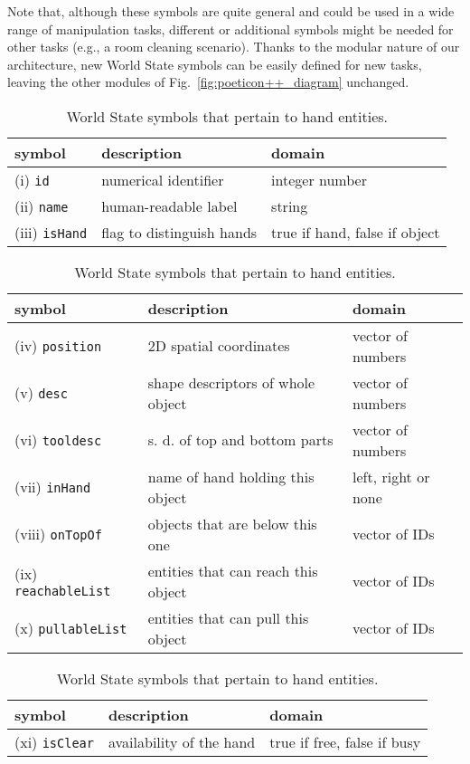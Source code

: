 Note that, although these symbols are quite general and could be used in a wide range of manipulation tasks, different or additional symbols might be needed for other tasks (e.g., a room cleaning scenario).
Thanks to the modular nature of our architecture, new World State symbols can be easily defined for new tasks, leaving the other modules of Fig.~\ref{fig:poeticon++_diagram} unchanged.

\begin{table}
\centering
\caption{World State symbols that pertain to all types of entities~(hands and objects).}
\label{tab:worldstatesym:common}
\begin{tabular}{*{3}{l}} %
\toprule
symbol              & description                         & domain \\
\midrule
(i) \verb!id!       & numerical identifier                & integer number \\
(ii) \verb!name!    & human-readable label                & string \\
(iii) \verb!isHand! & flag to distinguish hands           & true if hand, false if object \\
\bottomrule
\end{tabular}
%
\medskip
%
\centering
\scriptsize
\caption{World State symbols that pertain to object entities.}
\label{tab:worldstatesym:objects}
\begin{tabular}{*{3}{l}} %
\toprule
symbol                    & description                         & domain \\
\midrule
(iv) \verb!position!      & 2D spatial coordinates              & vector of numbers \\
(v) \verb!desc!           & shape descriptors of whole object   & vector of numbers \\
(vi) \verb!tooldesc!      & s. d. of top and bottom parts       & vector of numbers\\
(vii) \verb!inHand!       & name of hand holding this object    & left, right or none \\
(viii) \verb!onTopOf!     & objects that are below this one     & vector of IDs \\
(ix) \verb!reachableList! & entities that can reach this object & vector of IDs \\
(x) \verb!pullableList!   & entities that can pull this object  & vector of IDs \\
\bottomrule
\end{tabular}
%
\medskip
%
\centering
\caption{World State symbols that pertain to hand entities.}
\label{tab:worldstatesym:hands}
\begin{tabular}{*{3}{l}} %
\toprule
symbol              & description                         & domain \\
\midrule
(xi) \verb!isClear! & availability of the hand            & true if free, false if busy \\
\bottomrule
\end{tabular}
\end{table}

